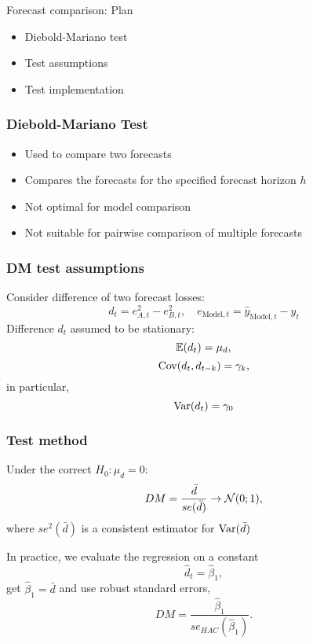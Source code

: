 
\begin{frame} %
	
	
\end{frame}



\begin{frame}{Forecast comparison: Plan}
	\begin{itemize}[<+->]
		\item Diebold-Mariano test
		\item Test \alert{assumptions}
		\item Test implementation
	\end{itemize}
	
\end{frame}

\begin{frame}
	\frametitle{Diebold-Mariano Test}
	
	\begin{itemize}[<+->]
		\item Used to compare \alert{two} forecasts
		\item Compares the forecasts for the specified \alert{forecast  horizon} $h$ 
		\item Not optimal for \alert{model comparison}
		\item Not suitable for \alert{pairwise} comparison of multiple forecasts
	\end{itemize}
	
\end{frame}

\begin{frame}
	\frametitle{DM test assumptions}
	
	Consider difference of two \alert{ forecast losses}:
	\[
	d_t = e_{A,t}^2 - e_{B,t}^2, \quad e_{\text{Model},t} = \hat y_{\text{Model},t} - y_t
	\]
	\pause
	Difference $d_t$ assumed to be \alert{stationary}:\pause
	\[
	\mathbb{E}(d_t) = \mu_d,
	\]
	\pause
	\[
	\operatorname{Cov}(d_t, d_{t-k}) = \gamma_k,
	\]\pause
	in particular,
	\[
	\operatorname{Var}(d_t) = \gamma_0
	\]
	
\end{frame}

\begin{frame}
	\frametitle{Test method}
	Under the correct $H_0: \mu_d = 0$:
	\[
	DM = \frac{\bar d}{se(\bar d)} \to \mathcal{N}(0;1),
	\]
	where $se^2(\bar d)$ is a consistent estimator for $\operatorname{Var}(\bar d)$
	\pause
	
	In practice, we  evaluate the regression on a constant
	\[
	\hat d_t = \hat \beta_1,
	\]
	\pause
	get $\hat\beta_1 = \bar d$ and use  \alert{robust standard errors},
	\[
	DM = \frac{\hat \beta_1}{se_{HAC}(\hat\beta_1)}.
	\]
\end{frame}

